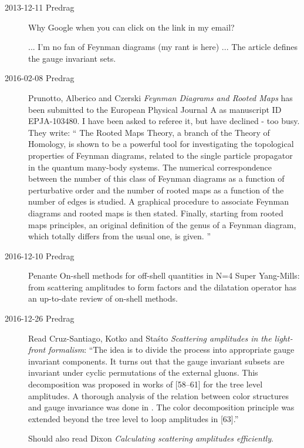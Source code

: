 \begin{description}
\item[2013-12-11  Predrag]
Why Google when you can click on the link in my email?

    ... I'm no fan of Feynman diagrams (my rant is
{here}) ... The article defines the gauge invariant sets.

\item[2016-02-08  Predrag]
Prunotto, Alberico and Czerski
{\em Feynman Diagrams and Rooted Maps}
has been submitted to the European Physical Journal A as manuscript ID EPJA-103480.
I have been asked to referee it, but have declined - too busy. They write: ``
The  Rooted Maps Theory, a branch of the Theory of Homology, is shown to be
a powerful tool for investigating  the topological properties of Feynman
diagrams, related to the single particle propagator in the quantum many-body
systems. The numerical correspondence between the number of this class of
Feynman diagrams as a function of perturbative order and the number of rooted
maps as a function of the number of edges is studied. A graphical procedure to
associate Feynman diagrams and rooted maps is then stated. Finally, starting
from rooted maps principles, an original definition of the genus of a
Feynman diagram, which totally differs from the usual one, is given.
''

\item[2016-12-10 Predrag]
Penante {{On-shell methods for off-shell quantities in N=4
Super Yang-Mills: from scattering amplitudes to form factors and the
dilatation operator}} has an up-to-date review of on-shell methods.

\item[2016-12-26 Predrag] Read
Cruz-Santiago, Kotko and Sta{\'s}to
{\em Scattering amplitudes in the light-front formalism}:
``The idea is to divide the process into appropriate gauge invariant
components. It turns out that the gauge invariant subsets are invariant
under cyclic permutations of the external gluons. This decomposition was
proposed in works of [58–61] for the tree level amplitudes. A thorough
analysis of the relation between color structures and gauge invariance
was done in . The color decomposition principle was
extended beyond the tree level to loop amplitudes in [63].''

Should also read Dixon
{\em Calculating scattering amplitudes efficiently}.


\end{description}
